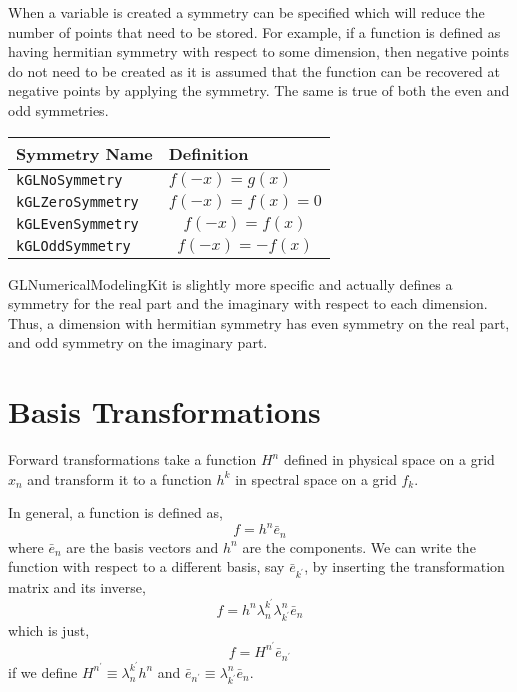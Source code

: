 \documentclass[11pt]{article}
\begin{document}
When a variable is created a symmetry can be specified which will reduce the number of points that need to be stored. For example, if a function is defined as having hermitian symmetry with respect to some dimension, then negative points do not need to be created as it is assumed that the function can be recovered at negative points by applying the symmetry. The same is true of both the even and odd symmetries.

\begin{tabular}{lL}
      \hline
      Symmetry Name & Definition \tabularnewline \hline \hline
      \verb"kGLNoSymmetry" &  $f(-x)=g(x)$ \tabularnewline
      \verb"kGLZeroSymmetry" &  \[ f(-x) = f(x) = 0 \] \tabularnewline
      \verb"kGLEvenSymmetry" &  \[ f(-x) = f(x) \] \tabularnewline
      \verb"kGLOddSymmetry" &  \[ f(-x) = - f(x)  \] \tabularnewline
      \hline
\end{tabular}

GLNumericalModelingKit is slightly more specific and actually defines a symmetry for the real part and the imaginary with respect to each dimension. Thus, a dimension with hermitian symmetry has even symmetry on the real part, and odd symmetry on the imaginary part.

%
%

\section{Basis Transformations}
Forward transformations take a function $H^n$ defined in physical space on a grid $x_n$ and transform it to a function $h^k$ in spectral space on a grid $f_k$.

In general, a function is defined as,
\begin{equation}
f = h^n \bar{e}_n
\end{equation}
where $\bar{e}_n$ are the basis vectors and $h^n$ are the components. We can write the function with respect to a different basis, say $\bar{e}_{k^\prime}$, by inserting the transformation matrix and its inverse,
\begin{equation}
f = h^n \lambda^{k^\prime}_n \lambda^n_{k^\prime} \bar{e}_n
\end{equation}
which is just,
\begin{equation}
f = H^{n^\prime} \bar{e}_{n^\prime}
\end{equation}
if we define $H^{n^\prime} \equiv \lambda^{k^\prime}_n h^n$ and $\bar{e}_{n^\prime} \equiv  \lambda^n_{k^\prime} \bar{e}_n$.
\end{document}
